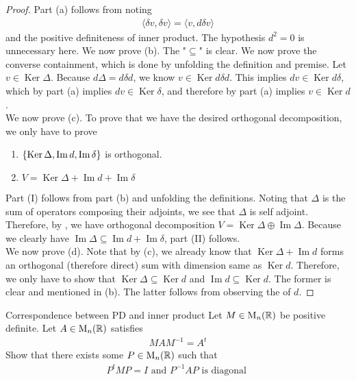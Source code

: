\documentclass{report}
\begin{document}
\begin{proof}
Part (a) follows from noting   
\begin{align*}
 \langle \delta v, \delta v\rangle = \langle v, d \delta v\rangle 
\end{align*}
and the positive definiteness of inner product. The hypothesis $d^2=0$ is unnecessary here. We now prove (b). The "$\subseteq$" is clear. We now prove the converse containment, which is done by unfolding the definition and premise. Let $v \in \operatorname{Ker}\Delta$. Because $d \Delta = d\delta d$, we know $v \in \operatorname{Ker}d\delta d$. This implies $dv \in \operatorname{Ker}d \delta$, which by part (a) implies $dv\in \operatorname{Ker}\delta$, and therefore by part (a) implies $v\in \operatorname{Ker}d$.  \\

We now prove (c). To prove that we have the desired orthogonal decomposition, we only have to prove 
\begin{enumerate}[label=(\Roman*)]
  \item $\left\{ \operatorname{Ker}\Delta , \operatorname{Im}d,\operatorname{Im}\delta \right\}$ is orthogonal. 
  \item $V=\operatorname{Ker}\Delta + \operatorname{Im}d + \operatorname{Im}\delta$
\end{enumerate}
Part (I) follows from part (b) and unfolding the definitions.  Noting that $\Delta$ is the sum of operators composing their adjoints, we see that $\Delta$ is self adjoint. Therefore, by , we have orthogonal decomposition $V= \operatorname{Ker}\Delta \oplus \operatorname{Im}\Delta $. Because we clearly have $\operatorname{Im}\Delta \subseteq \operatorname{Im}d + \operatorname{Im}\delta$, part (II) follows. \\

We now prove (d). Note that by (c), we already know that $\operatorname{Ker}\Delta  + \operatorname{Im}d$ forms an orthogonal (therefore direct) sum with dimension same as $\operatorname{Ker}d$. Therefore, we only have to show that $\operatorname{Ker}\Delta \subseteq \operatorname{Ker}d$ and $\operatorname{Im}d \subseteq \operatorname{Ker}d$. The former is clear and mentioned in (b). The latter follows from observing the   of $d$. 
\end{proof}
\begin{question}{Correspondence between PD and inner product}{}
Let $M \in \operatorname{M}_n(\mathbb{R})$ be positive definite. Let $A\in \operatorname{M}_{n}(\mathbb{R})$ satisfies 
\begin{align*}
MAM^{-1}=A^t
\end{align*}
Show that there exists some $P \in \operatorname{M}_n(\mathbb{R})$ such that 
\begin{align*}
P^t M P = I \text{ and }P^{-1}AP\text{ is diagonal }
\end{align*}
\end{question}
\end{document}
